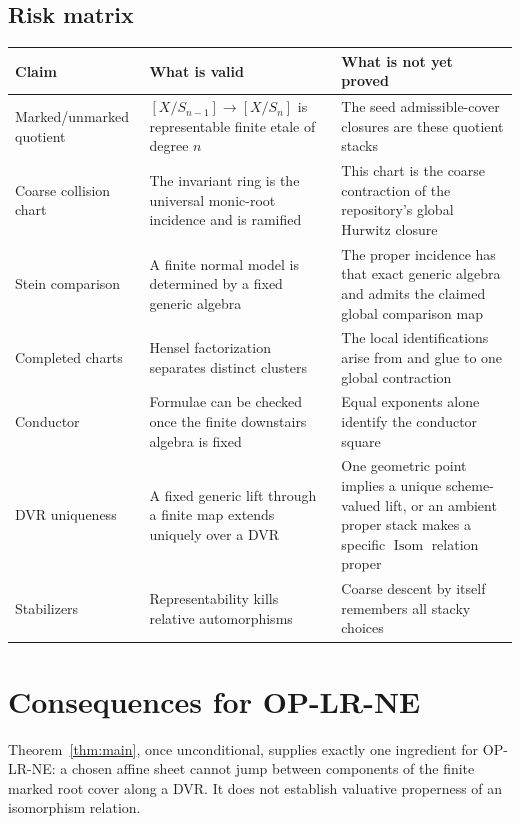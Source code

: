 \documentclass[11pt]{article}
\newcommand{\Isom}{\operatorname{Isom}}
\begin{document}
\subsection{Risk matrix}

\begin{center}
\small
\begin{tabular}{>{\raggedright\arraybackslash}p{}
                >{\raggedright\arraybackslash}p{}
                >{\raggedright\arraybackslash}p{}}
\toprule
Claim & What is valid & What is not yet proved \\
\midrule
Marked/unmarked quotient & $[X/S_{n-1}]\to[X/S_n]$ is representable finite
etale of degree $n$ & The seed admissible-cover closures are these quotient
stacks \\
Coarse collision chart & The invariant ring is the universal monic-root
incidence and is ramified & This chart is the coarse contraction of the
repository's global Hurwitz closure \\
Stein comparison & A finite normal model is determined by a fixed generic
algebra & The proper incidence has that exact generic algebra and admits the
claimed global comparison map \\
Completed charts & Hensel factorization separates distinct clusters & The
local identifications arise from and glue to one global contraction \\
Conductor & Formulae can be checked once the finite downstairs algebra is
fixed & Equal exponents alone identify the conductor square \\
DVR uniqueness & A fixed generic lift through a finite map extends uniquely
over a DVR & One geometric point implies a unique scheme-valued lift, or an
ambient proper stack makes a specific $\Isom$ relation proper \\
Stabilizers & Representability kills relative automorphisms & Coarse descent
by itself remembers all stacky choices \\
\bottomrule
\end{tabular}
\end{center}

\section{Consequences for OP-LR-NE}

Theorem~\ref{thm:main}, once unconditional, supplies exactly one ingredient
for OP-LR-NE: a chosen affine sheet cannot jump between components of the
finite marked root cover along a DVR.  It does not establish valuative
properness of an isomorphism relation.
\end{document}
